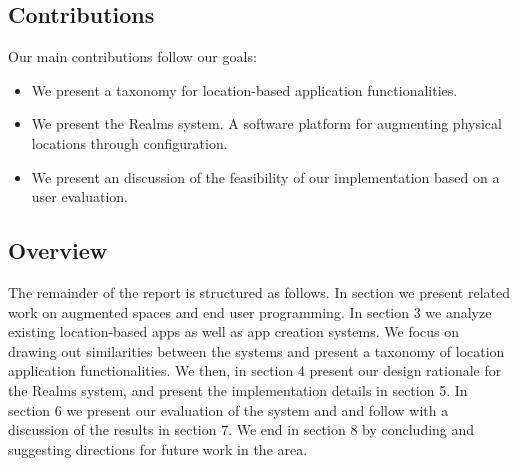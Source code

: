 \subsection{Contributions} %
\label{sub:contributions}
Our main contributions follow our goals:
\begin{itemize}
	\item We present a taxonomy for location-based application functionalities. 
	\item We present the Realms system. A software platform for augmenting physical locations through configuration.
	\item We present an discussion of the feasibility of our implementation based on a user evaluation.
\end{itemize}

\subsection{Overview} %
\label{sub:overview}
The remainder of the report is structured as follows. In section we present related work on augmented spaces and end user programming. In section 3 we analyze existing location-based apps as well as app creation systems. We focus on drawing out similarities between the systems and present a taxonomy of location application functionalities. We then, in section 4 present our design rationale for the Realms system, and present the implementation details in section 5. In section 6 we present our evaluation of the system and and follow with a discussion of the results in section 7. We end in section 8 by concluding and suggesting directions for future work in the area.
